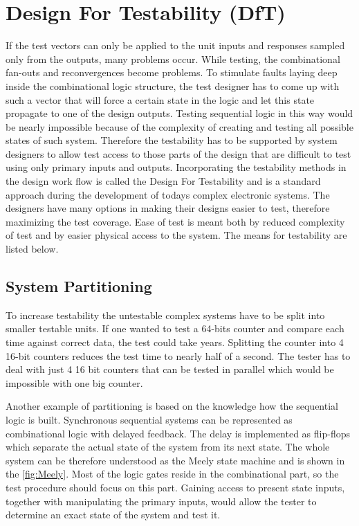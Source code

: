 \section{Design For Testability (DfT)}
If the test vectors can only be applied to the unit inputs and responses sampled only from the outputs, many problems occur. While testing, the combinational fan-outs and reconvergences become problems. To stimulate faults laying deep inside the combinational logic structure, the test designer has to come up with such a vector that will force a certain state in the logic and let this state propagate to one of the design outputs. Testing sequential logic in this way would be nearly impossible because of the complexity of creating and testing all possible states of such system. Therefore the testability has to be supported by system designers to allow test access to those parts of the design that are difficult to test using only primary inputs and outputs. Incorporating the testability methods in the design work flow is called the Design For Testability and is a standard approach during the development of todays complex electronic systems. The designers have many options in making their designs easier to test, therefore maximizing the test coverage. Ease of test is meant both by reduced complexity of test and by easier physical access to the system. The means for testability are listed below.
\subsection{System Partitioning}
To increase testability the untestable complex systems have to be split into smaller testable units. If one wanted to test a 64-bits counter and compare each time against correct data, the test could take years. Splitting the counter into 4 16-bit counters reduces the test time to nearly half of a second. The tester has to deal with just 4 16 bit counters that can be tested in parallel which would be impossible with one big counter.

Another example of partitioning is based on the knowledge how the sequential logic is built. Synchronous sequential systems can be represented as combinational logic with delayed feedback. The delay is implemented as flip-flops which separate the actual state of the system from its next state. The whole system can be therefore understood as the Meely state machine and is shown in the \autoref{fig:Meely}. Most of the logic gates reside in the combinational part, so the test procedure should focus on this part. Gaining access to present state inputs, together with manipulating the primary inputs, would allow the tester to determine an exact state of the system and test it.

